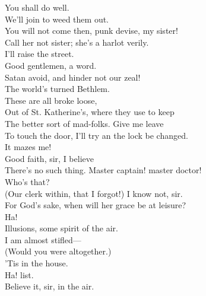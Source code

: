 \documentclass[a4paper,oneside,12pt]{memoir}
\begin{document}
\begin{drama*}
\tribulationspeaks You shall do well.\\
\persecutionspeaks {} We'll join to weed them out.\\
\kastrilspeaks You will not come then, punk devise, my sister!\\
\persecutionspeaks Call her not sister; she's a harlot verily.\\
\kastrilspeaks I'll raise the street.\\
\lovewitspeaks {} Good gentlemen, a word.\\
\persecutionspeaks Satan avoid, and hinder not our zeal!\\
\lovewitspeaks The world's turned Bethlem.\\
\facespeaks {} These are all broke loose,\\
Out of St. Katherine's, where they use to keep\\
The better sort of mad-folks. Give me leave\\
To touch the door, I'll try an the lock be changed.\\
\lovewitspeaks It mazes me!\\
\facespeaks {} Good faith, sir, I believe\\
There's no such thing.
\dapperspeaks {}  Master captain! master doctor!\\
\lovewitspeaks Who's that?\\
\facespeaks {} (Our clerk within, that I forgot!) I know not, sir.\\
\dapperspeaks {} For God's sake, when will her grace be at leisure?\\
\facespeaks {} Ha!\\
Illusions, some spirit of the air.\\
\dapperspeaks {}  I am almost stifled---\\
\facespeaks (Would you were altogether.)\\
\lovewitspeaks {} 'Tis in the house.\\
Ha! list.\\
\facespeaks {} Believe it, sir, in the air.\\

\end{drama*}
\end{document}
